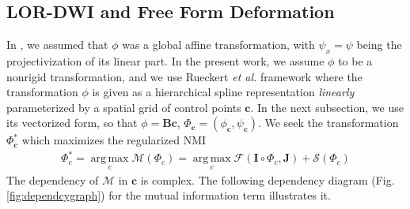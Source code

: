 \documentclass[twocolumn]{svjour3}
\begin{document}
\subsection{LOR-DWI and Free Form Deformation}
In \cite{jensen2015locally}, we assumed that $\phi$ was a global affine transformation,
with $\psi_x = \psi$ being the projectivization of its linear part. In the present work,
we assume $\phi$ to be a nonrigid transformation, and we use Rueckert \textit{et al.\/}
framework \cite{rueckert1999nonrigid} where the transformation $\phi$ is given as a
hierarchical spline representation \emph{linearly} parameterized by a spatial grid of
control points ${\bm c}$. In the next subsection, we use its vectorized form, so that
$\phi = \bm B\bm c$, $\Phi_{\bm c} = (\phi_{\bm c},\psi_{\bm c})$. We seek the
transformation $\Phi^*_{\bm c}$ which maximizes the regularized NMI
\begin{align}
  \Phi_c^* = \operatorname*{arg\,max}_c \mathcal M(\Phi_c) = \operatorname*{arg\,max}_c \mathcal F(\bm I\circ\Phi_c,\bm J)+\mathcal S({\Phi_c})
    \label{eq:argmax}
\end{align}
The dependency of $\mathcal M$ in $\bm c$ is complex. The following dependency diagram
(Fig. \ref{fig:dependcygraph}) for the mutual information term illustrates it.
\end{document}
